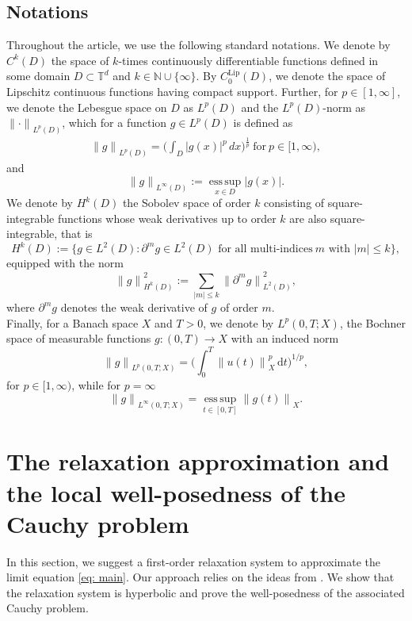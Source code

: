 \documentclass[11pt]{article}
\numberwithin{equation}{section}
\newtheorem{counter example}[theorem]{Counter Example}
\DeclareMathOperator{\lip}{Lip}
\numberwithin{equation}{section}
\numberwithin{equation}{section}
\begin{document}
\subsection*{Notations}\label{Notation}
Throughout the article, we use the following standard notations. We denote by $C^k(D)$ the space of $k$-times continuously differentiable functions defined in some domain $D\subset \mathbb{T}^d$ and $k\in \mathbb{N} \cup \{ \infty \}$. By $C^{\lip}_0(D)$, we denote the space of Lipschitz continuous functions having compact support. 
Further, for $p \in [1,\infty]$, we denote the Lebesgue space on $D$ as $L^p(D)$ and the $L^p(D)$-norm as ${\lVert \cdot \rVert}_{L^p(D)}$, which for a function $g \in L^p(D)$ is defined as
\begin{align*}
    {\lVert g\rVert}_{L^p(D)} = \biggl(\int_{D} |g(x)|^p \,dx\biggr)^{\frac{1}{p}} ~ \text{for}~p \in[1,\infty),
\end{align*}
and 
\[
{\lVert g\rVert}_{L^\infty(D)}
:=
\operatorname*{ess\,sup}_{x\in D}|g(x)|.
\]
We denote by $H^k(D)$ the Sobolev space of order $k$ consisting of 
square-integrable functions whose weak derivatives up to order $k$ are also square-integrable, that is
\[
    H^k(D)
    := \bigl\{ g \in {L}^{2}(D) : \partial^m g \in {L}^{2}(D)
        \text{ for all multi-indices}~ m \text{ with } |m| \le k \bigr\},
\]
equipped with the norm
\[
    {\lVert g \rVert}_{H^k(D)}^2
    := \sum_{|m| \le k} {\lVert \partial^m g \rVert}_{{L}^{2}(D)}^2,
\]
where $\partial^m g$ denotes the weak derivative of $g$ of order $m$. \\
Finally, for a Banach space $X$ and $T>0$, we denote by $L^p(0, T;X)$, the Bochner space of measurable functions $g:(0,T)\to X$ with an induced norm
\[
    {\lVert g \rVert}_{L^p(0,T;X)}
    = \biggl( \int_0^T {\lVert u(t) \rVert}_{X}^p \,\mathrm{d}t \biggr)^{1/p},
\]
for $p \in [1,\infty)$, while for $p = \infty$
\[
{\lVert g \rVert}_{L^{\infty}(0,T;X)}
    = \operatorname*{ess\,sup}_{t\in[0, T]} {\lVert g(t) \rVert}_{X}.
\]
\section{The relaxation approximation and the local well-posedness of the Cauchy problem}\label{sec: model}
In this section, we suggest a first-order relaxation system to approximate the limit equation \eqref{eq: main}. Our approach relies on the ideas from \cite{dhaouadi2025first,corli2012singular, corli2014parabolic}. We show that the relaxation system is hyperbolic and prove the well-posedness of the associated Cauchy problem.
\end{document}
